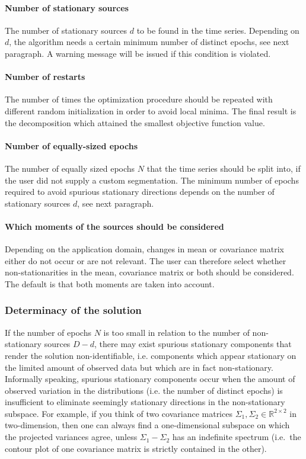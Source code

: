 \documentclass{article}
\newcommand{\R}{\ensuremath{\mathds{R}}}
\newcommand{\1}{\ensuremath{\mathds{1}}}
\newcommand{\0}{\ensuremath{0}}
\begin{document}
\paragraph{Number of stationary sources} The number of stationary sources $d$ to be 
found in the time series. Depending on $d$, the algorithm needs a certain minimum number 
of distinct epochs, see next paragraph. A warning message will be issued
if this condition is violated.

\paragraph{Number of restarts} The number of times the optimization procedure
should be repeated with different random initialization in order to avoid local minima.
The final result is the decomposition which attained the smallest objective function
value.

\paragraph{Number of equally-sized epochs} The number of equally sized epochs $N$ that 
the time series should be split into, if the user did not supply a custom segmentation.
The minimum number of epochs required to avoid spurious
stationary directions depends on the number of stationary sources $d$, see next paragraph. 

\paragraph{Which moments of the sources should be considered} Depending on the application domain, 
changes in mean or covariance matrix either do not occur or are not relevant. The user can therefore 
select whether non-stationarities in the mean, covariance matrix or both should be considered. 
The default is that both moments are taken into account.

\subsubsection*{Determinacy of the solution}
\label{sec:determinacy}

If the number of epochs $N$ is too small in relation to the number of 
non-stationary sources $D-d$, there may exist spurious stationary components that render
the solution non-identifiable, i.e. components which appear stationary on the
limited amount of observed data but which are in fact non-stationary.
Informally speaking, spurious stationary components occur when the amount of 
observed variation in the distributions (i.e. the number of distinct epochs)
 is insufficient to eliminate seemingly stationary directions in the non-stationary subspace. 
For example, if you think of two covariance matrices $\Sigma_1, \Sigma_2 \in \R^{2 \times 2}$ in two-dimension, 
then one can always find a one-dimensional subspace on which the projected variances 
agree, unless $\Sigma_1 - \Sigma_2$ has an indefinite spectrum (i.e.~the contour plot
of one covariance matrix is strictly contained in the other). 
\end{document}
